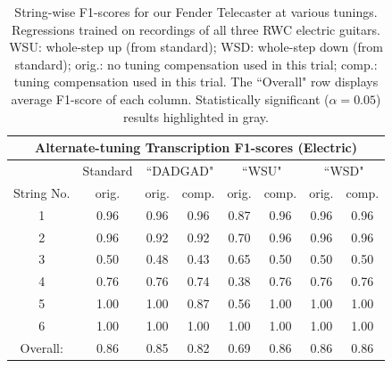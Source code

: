 \documentclass[convention,peer-reviewed]{aesconf}
\begin{document}
\begin{table}[!htbp]
\begin{center}
\begin{tabular}{||c||c||c|c||c|c||c|c||}
\hline
\multicolumn{8}{|c|}{\bf{Alternate-tuning Transcription F1-scores (Electric)}} \\
\hline
& Standard & \multicolumn{2}{|c|}{``DADGAD"} & \multicolumn{2}{|c|}{``WSU"} & \multicolumn{2}{|c|}{``WSD"} \\
\hline
String No. & orig. & orig. & comp. & orig. & comp. & orig. & comp. \\
\hline
1 & 0.96 & 0.96 & 0.96 & 0.87 & 0.96 & 0.96 & 0.96 \\
\hline
2 & 0.96 & 0.92 & 0.92 & 0.70 & 0.96 & 0.96 & 0.96\\
\hline
3 & 0.50 & 0.48 & 0.43 & 0.65 & 0.50 & 0.50 & 0.50\\
\hline
4 & 0.76 & 0.76 & 0.74 & 0.38 & 0.76 & 0.76 & 0.76 \\
\hline
5 & 1.00 & 1.00 & 0.87 & 0.56 & 1.00 & 1.00 & 1.00 \\
\hline
6 & 1.00 & 1.00 & 1.00 & 1.00 & 1.00 & 1.00 & 1.00\\ 
\hline
\hline
Overall: & 0.86 & 0.85 & 0.82 &  \cellcolor[gray]{0.8}0.69 & \cellcolor[gray]{0.8}0.86 & 0.86 & 0.86\\
\hline
\end{tabular}
\caption{String-wise F1-scores for our Fender Telecaster at various tunings. Regressions trained on recordings of all three RWC electric guitars. WSU: whole-step up (from standard); WSD: whole-step down (from standard); orig.: no tuning compensation used in this trial; comp.: tuning compensation used in this trial. The ``Overall" row displays average F1-score of each column. Statistically significant ($\alpha=0.05$) results highlighted in gray.} 
\label{tab:resultsTune}
\end{center}
\end{table}
\end{document}
